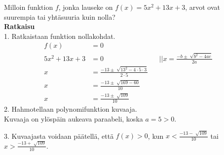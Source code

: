 \begin{esimerkki}
Milloin funktion $f$, jonka lauseke on $f(x)=5x^2+13x+3$, arvot ovat suurempia tai yhtäsuuria kuin nolla? \\
\textbf{Ratkaisu} \\
1. Ratkaistaan funktion nollakohdat.
\begin{align*}
f(x)&=0 \\
5x^2+13x+3&=0 \ \ \ \ \ \ \ &&||x=\frac{-b\pm \sqrt[]{b^2-4ac}}{2a} \\
x&=\frac{-13 \pm \sqrt[]{13^2-4 \cdot 5 \cdot 3}}{2 \cdot 5} \\
x&=\frac{-13 \pm \sqrt[]{169-60}}{10} \\
x&=\frac{-13 \pm \sqrt[]{109}}{10}  
\end{align*}
2. Hahmotellaan polynomifunktion kuvaaja. \\
Kuvaaja on ylöspäin aukeava paraabeli, koska $a=5>0$. 

\begin{lukusuora}{-2.5}{2.5}{5}
\end{lukusuora}

3. Kuvaajasta voidaan päätellä, että $f(x)>0$, kun $x<\frac{-13 - \sqrt[]{109}}{10}$ tai $x> \frac{-13 + \sqrt[]{109}}{10}$.  
\end{esimerkki} 
